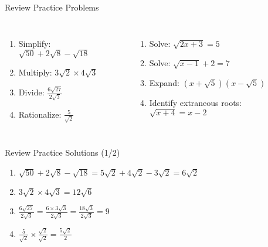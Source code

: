 \documentclass[aspectratio=169]{beamer}
\begin{document}
\begin{frame}{Review Practice Problems}
\begin{tcolorbox}[colback=lightgray,colframe=accent,title=Practice Problems]
\footnotesize
\begin{columns}[T]
\begin{enumerate}
  \item Simplify: $\sqrt{50} + 2\sqrt{8} - \sqrt{18}$
  \item Multiply: $3\sqrt{2} \times 4\sqrt{3}$
  \item Divide: $\frac{6\sqrt{27}}{2\sqrt{3}}$
  \item Rationalize: $\frac{5}{\sqrt{2}}$
\end{enumerate}
\begin{enumerate}
  \item Solve: $\sqrt{2x+3} = 5$
  \item Solve: $\sqrt{x-1} + 2 = 7$
  \item Expand: $(x+\sqrt{5})(x-\sqrt{5})$
  \item Identify extraneous roots: $\sqrt{x+4} = x-2$
\end{enumerate}
\end{columns}
\end{tcolorbox}
\end{frame}

\begin{frame}{Review Practice Solutions (1/2)}
\begin{tcolorbox}[colback=lightgray,colframe=primary,title=Solutions]
\footnotesize
\begin{enumerate}
  \item $\sqrt{50} + 2\sqrt{8} - \sqrt{18} = 5\sqrt{2} + 4\sqrt{2} - 3\sqrt{2} = 6\sqrt{2}$
  \item $3\sqrt{2} \times 4\sqrt{3} = 12\sqrt{6}$
  \item $\frac{6\sqrt{27}}{2\sqrt{3}} = \frac{6\times3\sqrt{3}}{2\sqrt{3}} = \frac{18\sqrt{3}}{2\sqrt{3}} = 9$
  \item $\frac{5}{\sqrt{2}} \times \frac{\sqrt{2}}{\sqrt{2}} = \frac{5\sqrt{2}}{2}$
\end{enumerate}
\end{tcolorbox}
\end{frame}
\end{document}
